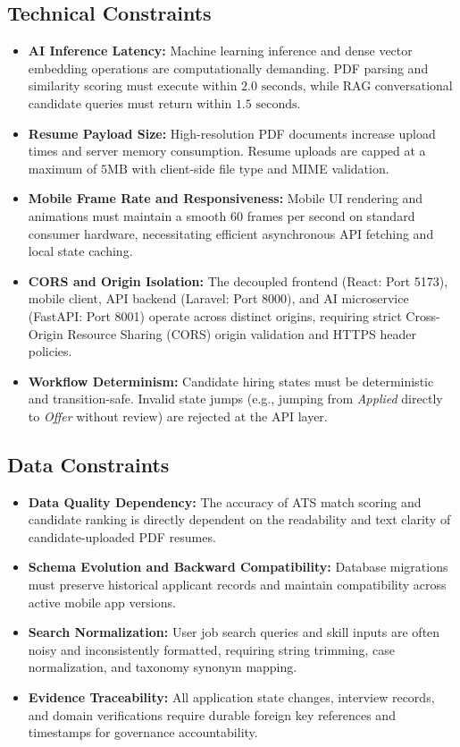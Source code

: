 \subsection{Technical Constraints}
\begin{itemize}
    \item \textbf{AI Inference Latency:} Machine learning inference and dense vector embedding operations are computationally demanding. PDF parsing and similarity scoring must execute within $2.0\text{ seconds}$, while RAG conversational candidate queries must return within $1.5\text{ seconds}$.
    \item \textbf{Resume Payload Size:} High-resolution PDF documents increase upload times and server memory consumption. Resume uploads are capped at a maximum of $5\text{MB}$ with client-side file type and MIME validation.
    \item \textbf{Mobile Frame Rate and Responsiveness:} Mobile UI rendering and animations must maintain a smooth 60 frames per second on standard consumer hardware, necessitating efficient asynchronous API fetching and local state caching.
    \item \textbf{CORS and Origin Isolation:} The decoupled frontend (React: Port 5173), mobile client, API backend (Laravel: Port 8000), and AI microservice (FastAPI: Port 8001) operate across distinct origins, requiring strict Cross-Origin Resource Sharing (CORS) origin validation and HTTPS header policies.
    \item \textbf{Workflow Determinism:} Candidate hiring states must be deterministic and transition-safe. Invalid state jumps (e.g., jumping from \textit{Applied} directly to \textit{Offer} without review) are rejected at the API layer.
\end{itemize}

\subsection{Data Constraints}
\begin{itemize}
    \item \textbf{Data Quality Dependency:} The accuracy of ATS match scoring and candidate ranking is directly dependent on the readability and text clarity of candidate-uploaded PDF resumes.
    \item \textbf{Schema Evolution and Backward Compatibility:} Database migrations must preserve historical applicant records and maintain compatibility across active mobile app versions.
    \item \textbf{Search Normalization:} User job search queries and skill inputs are often noisy and inconsistently formatted, requiring string trimming, case normalization, and taxonomy synonym mapping.
    \item \textbf{Evidence Traceability:} All application state changes, interview records, and domain verifications require durable foreign key references and timestamps for governance accountability.
\end{itemize}

